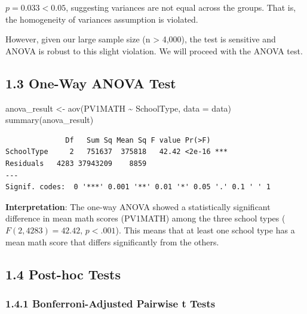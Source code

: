 \documentclass[
  letterpaper,
  DIV=11,
  numbers=noendperiod]{scrreprt}
\newenvironment{Shaded}{\begin{snugshade}}{\end{snugshade}}
\newcommand{\AttributeTok}[1]{\textcolor[rgb]{0.40,0.45,0.13}{#1}}
\newcommand{\FunctionTok}[1]{\textcolor[rgb]{0.28,0.35,0.67}{#1}}
\newcommand{\NormalTok}[1]{\textcolor[rgb]{0.00,0.23,0.31}{#1}}
\newcommand{\OtherTok}[1]{\textcolor[rgb]{0.00,0.23,0.31}{#1}}
\newcommand{\SpecialCharTok}[1]{\textcolor[rgb]{0.37,0.37,0.37}{#1}}
\begin{document}
\(p=0.033<0.05\), suggesting variances are not equal across the groups.
That is, the homogeneity of variances assumption is violated.

However, given our large sample size (n \textgreater{} 4,000), the test
is sensitive and ANOVA is robust to this slight violation. We will
proceed with the ANOVA test.

\subsection*{1.3 One-Way ANOVA Test}\label{one-way-anova-test}

\begin{Shaded}
\begin{Highlighting}[]
\NormalTok{anova\_result }\OtherTok{\textless{}{-}} \FunctionTok{aov}\NormalTok{(PV1MATH }\SpecialCharTok{\textasciitilde{}}\NormalTok{ SchoolType, }\AttributeTok{data =}\NormalTok{ data) }
\FunctionTok{summary}\NormalTok{(anova\_result) }
\end{Highlighting}
\end{Shaded}

\begin{verbatim}
              Df   Sum Sq Mean Sq F value Pr(>F)    
SchoolType     2   751637  375818   42.42 <2e-16 ***
Residuals   4283 37943209    8859                   
---
Signif. codes:  0 '***' 0.001 '**' 0.01 '*' 0.05 '.' 0.1 ' ' 1
\end{verbatim}

\textbf{Interpretation}: The one-way ANOVA showed a statistically
significant difference in mean math scores (PV1MATH) among the three
school types (\(F(2,4283)=42.42, \,p<.001\)). This means that at least
one school type has a mean math score that differs significantly from
the others.

\subsection*{1.4 Post-hoc Tests}\label{post-hoc-tests}

\subsubsection*{1.4.1 Bonferroni-Adjusted Pairwise t
Tests}\label{bonferroni-adjusted-pairwise-t-tests}
\end{document}
